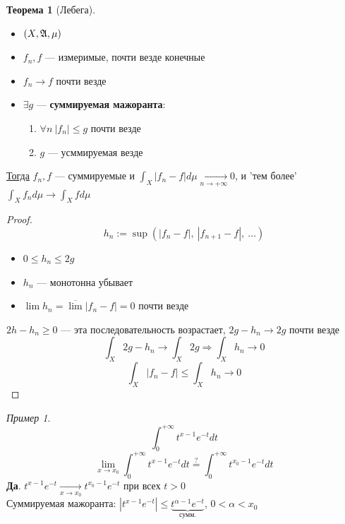 \documentclass[russ,oneside]{book}
\theoremstyle{plain}
\theoremstyle{remark}
\newtheorem*{examp}{Пример}
\theoremstyle{definition}
\newtheorem{theorem}{Теорема}[section]
\begin{document}
\begin{theorem}[Лебега]
\-
\begin{itemize}
\item \((X, \mathfrak{A}, \mu)\)
\item \(f_n, f\) --- измеримые, почти везде конечные
\item \(f_n \to f\) почти везде
\item \(\exists g\) --- \textbf{суммируемая мажоранта}:
\begin{enumerate}
\item \label{lebega_1} \(\forall n\ |f_n| \le g\) почти везде
\item \(g\) --- усммируемая везде
\end{enumerate}
\end{itemize}
\uline{Тогда} \(f_n, f\) --- суммируемые и \(\int_X |f_n - f|d\mu\xrightarrow[n \to + \infty]{}0\), и 'тем более' \(\int_X f_n d\mu \to \int_X f d\mu\)
\end{theorem}
\begin{proof}
\[ h_n := \sup(|f_n - f|,\ |f_{n + 1} - f|,\ \dots) \]
\begin{itemize}
\item \(0 \le h_n \le 2g\)
\item \(h_n\) --- монотонна убывает
\item \(\lim h_n = \overline{\lim}|f_n - f| = 0\) почти везде
\end{itemize}
\(2h - h_n \ge 0\) --- эта последовательность возрастает, \(2g - h_n \to 2g\) почти везде
\[ \int_X 2g - h_n \to \int_X 2g \Rightarrow \int_X h_n \to 0 \]
\[ \int_X|f_n -f| \le \int_X h_n \to 0 \]
\end{proof}
\begin{examp}
\[ \int_0^{ + \infty} t^{x - 1}e^{-t} dt \]
\[ \lim_{x \to x_0} \int_0^{ + \infty} t^{x - 1} e^{-t} dt \overset{?}{=} \int_0^{ + \infty}t^{x_0 - 1}e^{-t} dt\]
\textbf{Да}. \(t^{x - 1} e^{-t} \xrightarrow[x \to x_0]{} t^{x_0 - 1}e^{-t}\) при всех \(t>0\) \\
Суммируемая мажоранта: \(|t^{x - 1}e^{-t}| \le \underbrace{t^{\alpha - 1}e^{-t}}_\text{сумм.}\), \(0 < \alpha < x_0\)
\end{examp}
\end{document}
